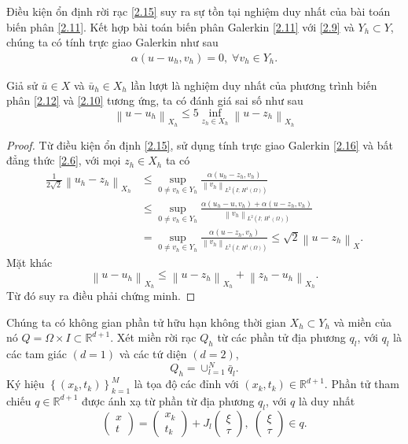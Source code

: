 \documentclass[]{article}
\begin{document}
\noindent Điều kiện ổn định rời rạc \eqref{2.15} suy ra sự tồn tại nghiệm duy nhất của bài toán biến phân \eqref{2.11}. Kết hợp bài toán biến phân Galerkin \eqref{2.11} với \eqref{2.9} và $Y_h\subset Y$, chúng ta có tính trực giao Galerkin như sau
\begin{align}\label{2.16}
	\alpha(u-u_h, v_h)=0,\; \forall v_h\in Y_h.
\end{align}
\begin{dl}\label{dl2.3}
	Giả sử $\bar{u}\in X$ và $\bar{u}_h\in X_h$ lần lượt là nghiệm duy nhất của phương trình biến phân \eqref{2.12} và \eqref{2.10} tương ứng, ta có đánh giá sai số như sau 
	$$\left\|u-u_h\right\|_{X_h}\leq 5\inf_{z_h\in X_h}\left\|u-z_h\right\|_{X_h}$$
\end{dl}
\begin{proof}
	Từ điều kiện ổn định \eqref{2.15}, sử dụng tính trực giao Galerkin \eqref{2.16} và bất đẳng thức \eqref{2.6}, với mọi $z_h\in X_h$ ta có
	\begin{align*}
	\frac{1}{2\sqrt{2}}\left\|u_h-z_h\right\|_{X_h}&\leq \sup_{0\neq v_h\in Y_h}\frac{\alpha(u_h-z_h, v_h)}{\left\|v_h\right\|_{L^2(I;\,H^1(\Omega))}}\\
	&\leq \sup_{0\neq v_h\in Y_h}\frac{\alpha(u_h-u, v_h)+\alpha(u-z_h, v_h)}{\left\|v_h\right\|_{L^2(I;\,H^1(\Omega))}}\\
	&=\sup_{0\neq v_h\in Y_h}\frac{\alpha(u-z_h, v_h)}{\left\|v_h\right\|_{L^2(I;\,H^1(\Omega))}}\leq \sqrt{2}\left\|u-z_h\right\|_X.
	\end{align*}
	Mặt khác
	$$\left\|u-u_h\right\|_{X_h}\leq \left\|u-z_h\right\|_{X_h}+\left\|z_h-u_h\right\|_{X_h}.$$
	Từ đó suy ra điều phải chứng minh.
\end{proof}
\noindent Chúng ta có không gian phần tử hữu hạn không thời gian $X_h\subset Y_h$ và miền của nó $Q=\Omega\times I\subset \mathbb{R}^{d+1}$. Xét miền rời rạc $Q_h$ từ các phần tử địa phương $q_l$, với $q_l$ là các tam giác $(d=1)$ và các tứ diện $(d=2)$,
$$Q_h=\cup_{l=1}^{N}\bar{q}_l.$$
Ký hiệu $\left\lbrace (x_k, t_k)\right\rbrace_{k=1}^M $ là tọa độ các đỉnh với $(x_k, t_k)\in \mathbb{R}^{d+1}$. Phần tử tham chiếu $q\in \mathbb{R}^{d+1}$ được ánh xạ từ phần từ địa phương $q_l$, với $q$ là duy nhất
$$\begin{pmatrix}x\\t\end{pmatrix}=\begin{pmatrix}x_k\\t_k\end{pmatrix}+J_l\begin{pmatrix}\xi\\\tau\end{pmatrix}, \; \begin{pmatrix}\xi\\\tau\end{pmatrix}\in q.$$
\end{document}
